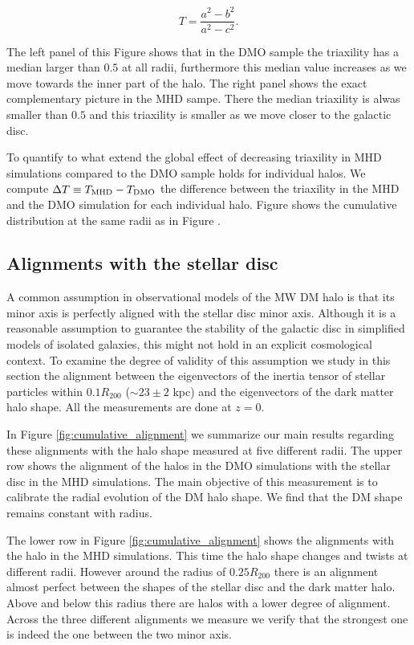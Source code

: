 \documentclass[usenatbib]{mnras}
\begin{document}
\begin{equation}
T=\frac{a^2-b^2}{a^2-c^2}.
\label{eq:triaxiality}
\end{equation}

The left panel of this Figure shows that in the DMO sample the
triaxility has a median larger than $0.5$ at all radii, furthermore
this median value increases as we move towards the inner part of the
halo.
The right panel shows the exact complementary picture in the MHD
sampe.
There the median triaxility is alwas smaller than $0.5$ and this
triaxility is smaller as we move closer to the galactic disc.


To quantify to what extend the global effect of decreasing
triaxility in MHD simulations compared to the DMO sample 
holds for individual halos. 
We compute $\Delta T\equiv T_{\rm MHD}-T_{\rm DMO}$ the difference between the
triaxility in the MHD and the DMO simulation for each individual halo. 
Figure \label{fig:delta_triaxial_cumulative} shows the cumulative
distribution at the same radii as in
Figure \label{fig:delta_triaxial_cumulative}. 
    

\subsection{Alignments with the stellar disc}


A common assumption in observational models of the MW DM halo is that
its minor axis is perfectly aligned with the stellar disc minor axis.
Although it is a reasonable assumption to guarantee the stability of
the galactic disc in simplified models of isolated galaxies, this
might not hold in an explicit cosmological context. 
To examine the degree of validity of this assumption we study in this
section the alignment between the eigenvectors of the inertia tensor of
stellar particles within $0.1R_{200}$ ($\sim 23\pm 2$ kpc) and the
eigenvectors of the dark matter halo shape.
All the measurements are done at $z=0$.

In Figure \ref{fig:cumulative_alignment} we summarize our main results
regarding these alignments with the halo shape measured at five
different radii.
The upper row shows the alignment of the halos in the DMO simulations
with the stellar disc in the MHD simulations.
The main objective of this measurement is to calibrate the radial
evolution of the DM halo shape. 
We find that the DM shape remains constant with radius.

The lower row in Figure \ref{fig:cumulative_alignment} shows the
alignments with the halo in the MHD simulations. 
This time the halo shape changes and twists at different radii.
However around the radius of $0.25R_{200}$ there is an alignment
almost perfect between the shapes of the stellar disc and the dark
matter halo. 
Above and below this radius there are halos with a lower degree of
alignment.
Across the three different alignments we measure we verify that the
strongest one is indeed the one between the two minor axis.
\end{document}
